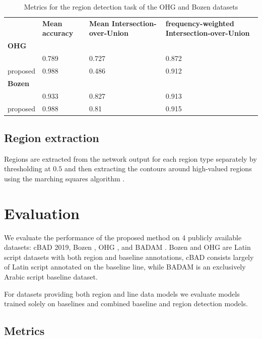 \begin{table}[h!]
\begin{center}
\caption{Metrics for the region detection task of the OHG and Bozen datasets}
\label{tab:regs}
\begin{tabularx}{\textwidth}{lXXX} \toprule
	& \textbf{Mean accuracy} & \textbf{Mean Intersection-over-Union} & \textbf{frequency-weighted Intersection-over-Union}\\
\addlinespace
\textbf{OHG}\ \\ \midrule
\cite{quiros2018multi} & 0.789 & 0.727 & 0.872\\
proposed & 0.988 & 0.486 & 0.912\\
\addlinespace
\textbf{Bozen}\ \\ \midrule
\cite{quiros2018multi} & 0.933 & 0.827 & 0.913\\
proposed & 0.988 & 0.81 & 0.915\\
\bottomrule
\end{tabularx}
\end{center}
\end{table}

\subsection{Region extraction}

Regions are extracted from the network output for each region type separately
by thresholding at $0.5$ and then extracting the contours around high-valued
regions using the marching squares algorithm \cite{lorensen1987marching}.

\section{Evaluation}

We evaluate the performance of the proposed method on 4 publicly available
datasets: cBAD 2019\cite{diem_markus_2019_3568023}, Bozen
\cite{toselli_a_h_2018_1164045}, OHG \cite{quiros2018hmms}, and BADAM
\cite{kiessling2019badam}. Bozen and OHG are Latin script datasets
with both region and baseline annotations, cBAD consists largely of Latin
script annotated on the baseline line, while BADAM is an exclusively Arabic
script baseline dataset.

For datasets providing both region and line data models we evaluate models
trained solely on baselines and combined baseline and region detection models.

\subsection{Metrics}

